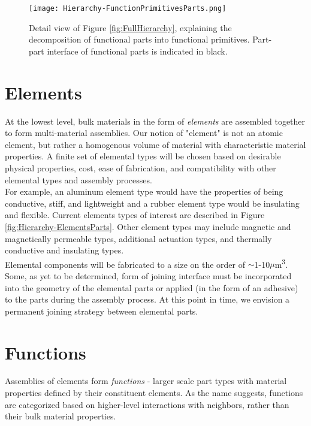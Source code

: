 {\begin{figure}
  \texttt{[image: Hierarchy-FunctionPrimitivesParts.png]}
  \caption{Detail view of Figure \ref{fig:FullHierarchy}, explaining the decomposition of functional parts into functional primitives.  Part-part interface of functional parts is indicated in black.}
  \label{fig:Hierarchy-FunctionPrimitivesParts}
\end{figure}

\section{Elements}\label{sec:elements}

At the lowest level, bulk materials in the form of \textit{elements} are assembled together to form multi-material assemblies.  Our notion of "element" is not an atomic element, but rather a homogenous volume of material with characteristic material properties.  A finite set of elemental types will be chosen based on desirable physical properties, cost, ease of fabrication, and compatibility with other elemental types and assembly processes.\\

For example, an aluminum element type would have the properties of being conductive, stiff, and lightweight and a rubber element type would be insulating and flexible.  Current elements types of interest are described in Figure \ref{fig:Hierarchy-ElementsParts}.  Other element types may include magnetic and magnetically permeable types, additional actuation types, and thermally conductive and insulating types.\\

Elemental components will be fabricated to a size on the order of $\sim$1-10$\mu$m\textsuperscript{3}.  Some, as yet to be determined, form of joining interface must be incorporated into the geometry of the elemental parts or applied (in the form of an adhesive) to the parts during the assembly process.  At this point in time, we envision a permanent joining strategy between elemental parts.

\section{Functions}

Assemblies of elements form \textit{functions} - larger scale part types with material properties defined by their constituent elements.  As the name suggests, functions are categorized based on higher-level interactions with neighbors, rather than their bulk material properties.\\

}
